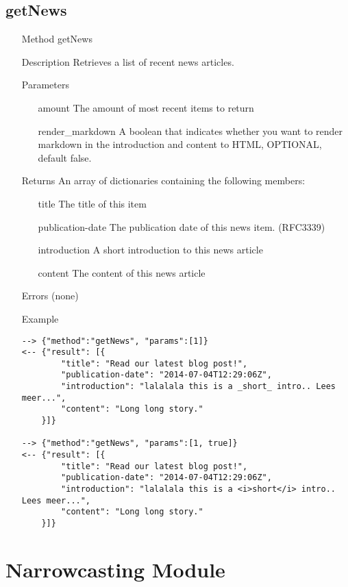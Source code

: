 \documentclass[a4paper]{scrreprt}
\begin{document}
\clearpage

\subsection{getNews}
\begin{enumerate}
\item[Method] getNews
\item[Description] Retrieves a list of recent news articles.
\item[Parameters] 
    \begin{enumerate}
        \item[amount] The amount of most recent items to return
        \item[render_markdown] A boolean that indicates whether you want to render markdown in the introduction and content to HTML, OPTIONAL, default false.
    \end{enumerate}

\item[Returns] An array of dictionaries containing the following members:
\begin{enumerate}
    \item[title] The title of this item
	\item[publication-date] The publication date of this news item. (RFC3339)
    \item[introduction] A short introduction to this news article
    \item[content] The content of this news article
	\end{enumerate}
\item[Errors] (none)
\item[Example]
\begin{lstlisting}
--> {"method":"getNews", "params":[1]}
<-- {"result": [{
        "title": "Read our latest blog post!", 
        "publication-date": "2014-07-04T12:29:06Z", 
        "introduction": "lalalala this is a _short_ intro.. Lees meer...", 
        "content": "Long long story." 
    }]}

--> {"method":"getNews", "params":[1, true]}
<-- {"result": [{
        "title": "Read our latest blog post!", 
        "publication-date": "2014-07-04T12:29:06Z", 
        "introduction": "lalalala this is a <i>short</i> intro.. Lees meer...", 
        "content": "Long long story." 
    }]}
\end{lstlisting}
\end{enumerate}

\section{Narrowcasting Module}
\end{document}
